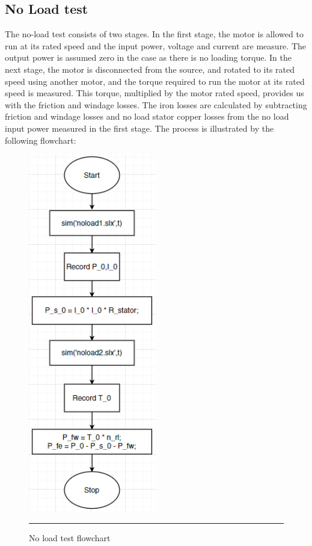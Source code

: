 \subsection{No Load test}
The no-load test consists of two stages. In the first stage, the motor is allowed to run at its rated speed and the input power, voltage and current are measure. The output power is assumed zero in the case as there is no loading torque. In the next stage, the motor is disconnected from the source, and rotated to its rated speed using another motor, and the torque required to run the motor at its rated speed is measured. This torque, multiplied by the motor rated speed, provides us with the friction and windage losses. The iron losses are calculated by subtracting friction and windage losses and no load stator copper losses from the no load input power measured in the first stage. The process is illustrated by the following flowchart:
\begin{figure}[htbp]
	\centering
		\includegraphics[width = 2.2in]{./Figures/MS/fig44.png}
		\rule{35em}{0.5pt}
	\caption{No load test flowchart}
	\label{fig:No load test flowchart} 
\end{figure}

